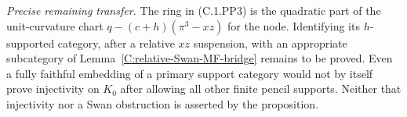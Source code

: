 \noindent\emph{Precise remaining transfer.}
The ring in (C.1.PP3) is the quadratic part of the unit-curvature
chart $q-(c+h)(\pi^3-xz)$ for the node.
Identifying its $h$-supported category, after a relative
$xz$ suspension, with an appropriate subcategory of
Lemma~\ref{C:relative-Swan-MF-bridge} remains to be proved.
Even a fully faithful embedding of a primary support category
would not by itself prove injectivity on $K_0$ after allowing
all other finite pencil supports.  Neither that injectivity
nor a Swan obstruction is asserted by the proposition.
